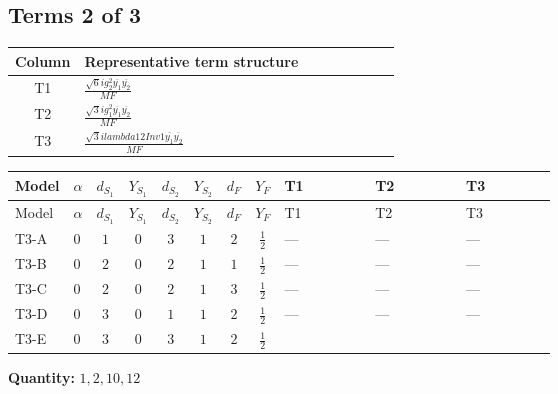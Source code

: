\documentclass[8pt]{article}
\begin{document}
\begin{landscape}
\subsection*{Terms 2 of 3}
\begin{center}
\begin{tabular}{@{}c >{\raggedright\arraybackslash}p{0.82\linewidth}@{}}
\toprule
Column & Representative term structure \\
\midrule
T1 & \(\displaystyle \frac{\sqrt{6} i g_{2}^{2} \overline{y_{1}} \overline{y_{2}}}{MF}\) \\
\midrule
T2 & \(\displaystyle \frac{\sqrt{3} i g_{1}^{2} \overline{y_{1}} \overline{y_{2}}}{MF}\) \\
\midrule
T3 & \(\displaystyle \frac{\sqrt{3} i lambda12Inv1 \overline{y_{1}} \overline{y_{2}}}{MF}\) \\
\midrule
\bottomrule
\end{tabular}
\end{center}
\smallskip
\tiny
\begin{longtable}{@{}llcccccc >{\raggedright\arraybackslash}p{0.21\linewidth} >{\raggedright\arraybackslash}p{0.21\linewidth} >{\raggedright\arraybackslash}p{0.21\linewidth}@{}}
\toprule
Model & $\alpha$ & $d_{S_1}$ & $Y_{S_1}$ & $d_{S_2}$ & $Y_{S_2}$ & $d_F$ & $Y_F$ & T1 & T2 & T3 \\
\midrule
\endfirsthead
\toprule
Model & $\alpha$ & $d_{S_1}$ & $Y_{S_1}$ & $d_{S_2}$ & $Y_{S_2}$ & $d_F$ & $Y_F$ & T1 & T2 & T3 \\
\midrule
\endhead
T3-A & $0$ & $1$ & $0$ & $3$ & $1$ & $2$ & $\frac{1}{2}$ & --- & --- & --- \\
\midrule
T3-B & $0$ & $2$ & $0$ & $2$ & $1$ & $1$ & $\frac{1}{2}$ & --- & --- & --- \\
\midrule
T3-C & $0$ & $2$ & $0$ & $2$ & $1$ & $3$ & $\frac{1}{2}$ & --- & --- & --- \\
\midrule
T3-D & $0$ & $3$ & $0$ & $1$ & $1$ & $2$ & $\frac{1}{2}$ & --- & --- & --- \\
\midrule
T3-E & $0$ & $3$ & $0$ & $3$ & $1$ & $2$ & $\frac{1}{2}$ & \scriptsize\adjustbox{max width=\linewidth}{$\begin{gathered} - \frac{\sqrt{6} i g_{2}^{2} \overline{y_{1}} \overline{y_{2}}}{6 MF}\end{gathered}$} & \scriptsize\adjustbox{max width=\linewidth}{$\begin{gathered} - \frac{\sqrt{3} i g_{1}^{2} \overline{y_{1}} \overline{y_{2}}}{8 MF}\end{gathered}$} & \scriptsize\adjustbox{max width=\linewidth}{$\begin{gathered} \frac{\sqrt{3} i lambda12Inv1 \overline{y_{1}} \overline{y_{2}}}{6 MF}\end{gathered}$} \\
\midrule
\bottomrule
\end{longtable}
\clearpage
\noindent\textbf{Quantity: }$\mathrm{1,2,10,12}$\par\smallskip

\end{landscape}
\end{document}
